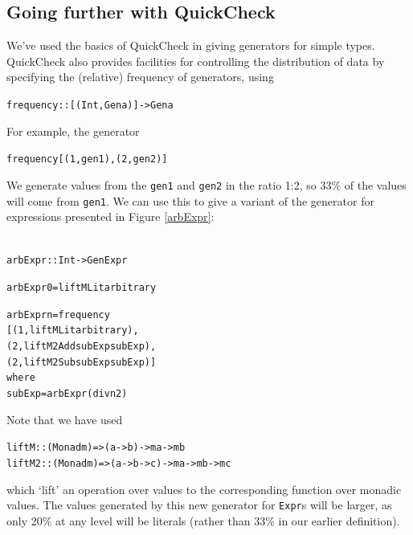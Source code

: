 \subsection*{Going further with QuickCheck}

We've used the basics of QuickCheck in giving generators for simple types. QuickCheck also provides facilities for controlling the distribution of data by specifying the (relative) frequency of generators, using
\begin{alltt}
frequency :: [(Int, Gen a)] -> Gen a
\end{alltt}
For example, the generator
\begin{alltt}
frequency [(1,gen1),(2,gen2)]
\end{alltt} 
We generate values from the \texttt{gen1} and \texttt{gen2} in the ratio 1:2, so 33\% of the values will come from \texttt{gen1}. We can use this to give a variant of the generator for expressions presented in Figure \ref{arbExpr}:
\begin{alltt}\label{arbExpr2}
arbExpr :: Int -> Gen Expr

arbExpr 0 = liftM Lit arbitrary

arbExpr n = frequency
    [(1, liftM Lit arbitrary),
     (2, liftM2 Add subExp subExp),
     (2, liftM2 Sub subExp subExp)]
        where
          subExp = arbExpr (div n 2)
\end{alltt}
Note that we have used
\begin{alltt}
liftM  :: (Monad m) => (a -> b) -> m a -> m b
liftM2 :: (Monad m) => (a -> b -> c) -> m a -> m b -> m c
\end{alltt}
which `lift' an operation over values to the corresponding function over monadic values.
The values generated by this new generator for \texttt{Expr}s will be larger, as only 20\% at any level will be literals (rather than 33\% in our earlier definition).

\begin{figure}[t]
\end{figure}

